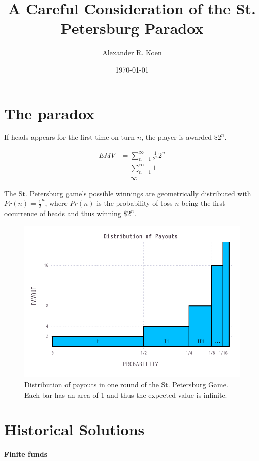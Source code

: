 \documentclass{article}
\title{A Careful Consideration of the St. Petersburg Paradox}
\author{Alexander R. Koen}
\date{\today}
\begin{document}
\maketitle

\section{The paradox}

If heads appears for the first time on turn $n$, the player is awarded $\$2^n$.


\begin{align*}
\label{eq:1}
  EMV &= \sum_{n=1}^{\infty} \frac{1}{2^{n}}2^n \\
      &= \sum_{n=1}^{\infty}1 \\
      &= \infty
\end{align*}

The St. Petersburg game's possible winnings are geometrically distributed with $Pr(n)=\frac{1}{2}^{n}$, where $Pr(n)$ is the probability of toss $n$ being the first occurrence of heads and thus winning $\$2^n$.

\begin{figure}[htb]
  \centering
  \includegraphics{distribution}
  \caption{Distribution of payouts in one round of the St. Petersburg Game. Each bar has an area of 1 and thus the expected value is infinite.}
  \label{fig:distribution}
\end{figure}

\section{Historical Solutions}
\paragraph{Finite funds}
\end{document}
